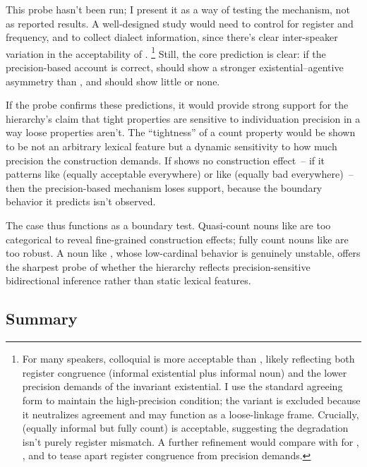 \documentclass[12pt,a4paper]{article}
\begin{document}
This probe hasn't been run; I present it as a way of testing the mechanism, not as reported results. A well-designed study would need to control for register and frequency, and to collect dialect information, since there's clear inter-speaker variation in the acceptability of .%
\footnote{For many speakers, colloquial  is more acceptable than , likely reflecting both register congruence (informal existential plus informal noun) and the lower precision demands of the invariant existential. I use the standard agreeing form  to maintain the high-precision condition; the  variant is excluded because it neutralizes agreement and may function as a loose-linkage frame. Crucially,  (equally informal but fully count) is acceptable, suggesting the  degradation isn't purely register mismatch. A further refinement would compare  with  for , , and  to tease apart register congruence from precision demands.}
Still, the core prediction is clear: if the precision-based account is correct,  should show a stronger existential--agentive asymmetry than , and  should show little or none.

If the probe confirms these predictions, it would provide strong support for the hierarchy's claim that tight properties are sensitive to individuation precision in a way loose properties aren't. The \enquote{tightness} of a count property would be shown to be not an arbitrary lexical feature but a dynamic sensitivity to how much precision the construction demands. If  shows no construction effect~-- if it patterns like  (equally acceptable everywhere) or like  (equally bad everywhere)~-- then the precision-based mechanism loses support, because the boundary behavior it predicts isn't observed.

The  case thus functions as a boundary test. Quasi-count nouns like  are too categorical to reveal fine-grained construction effects; fully count nouns like  are too robust. A noun like , whose low-cardinal behavior is genuinely unstable, offers the sharpest probe of whether the hierarchy reflects precision-sensitive bidirectional inference rather than static lexical features.

\subsection{Summary}
\end{document}
